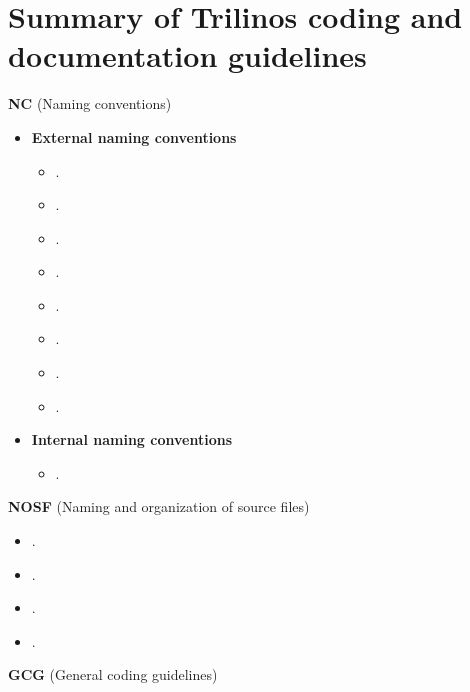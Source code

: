 %
\section{Summary of Trilinos coding and documentation guidelines}
\label{sec:summary_guidelines}
%

\noindent\textbf{NC} (Naming conventions)

  \setcounter{Thyra_NC_counter}{0}

  \begin{itemize}
  \item\textbf{External naming conventions}
    \begin{itemize}
    \item\NCNamespaceAllNames.
    \item\NCClassNames.
    \item\NCNamespaceNames.
    \item\NCEnumNames.
    \item\NCObjectNames.
    \item\NCFunctionNames.
    \item\NCBaseDefaultClassNames.
    \item\NCConstNonconstAccessFunctionName.
    \end{itemize}
  \item\textbf{Internal naming conventions}
    \begin{itemize}
    \item\NCDataMemberNames.
    \end{itemize}
  \end{itemize}

\noindent\textbf{NOSF} (Naming and organization of source files)

  \setcounter{Thyra_NOSF_counter}{0}

  \begin{itemize}
  \item\NOSFFileExtension.
  \item\NOSFClassFiles.
  \item\NOSFIncludeGuards.
  \item\NOSFCopyrightHeaders.
  \end{itemize}

\noindent\textbf{GCG} (General coding guidelines)

  \setcounter{Thyra_GCG_counter}{0}

